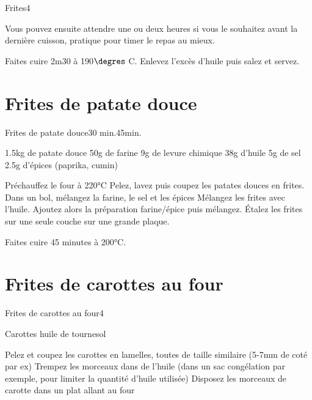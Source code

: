 {\begin{recette}{Frites}{4}{}{}
\begin{cuisson}
Vous pouvez ensuite attendre une ou deux heures si vous le souhaitez avant la dernière cuisson, pratique pour timer le repas au mieux. 

Faites cuire 2m30 à 190$\degres$ C. Enlevez l'excès d'huile puis salez et servez. 
\end{cuisson}
\end{recette}


\section{Frites de patate douce}
\begin{recette}{Frites de patate douce}{}{30 min.}{45min.}
\begin{ingredients}
\ingredient 1.5kg de patate douce
\ingredient 50g de farine
\ingredient 9g de levure chimique
\ingredient 38g d'huile
\ingredient 5g de sel
\ingredient 2.5g d'épices (paprika, cumin)
\end{ingredients}

\begin{preparation}
\etape Préchauffez le four à 220°C
\etape Pelez, lavez puis coupez les patates douces en frites.
\etape Dans un bol, mélangez la farine, le sel et les épices
\etape Mélangez les frites avec l'huile. Ajoutez alors la préparation farine/épice puis mélangez.
\etape Étalez les frites sur une seule couche sur une grande plaque.
\end{preparation}

\begin{cuisson}
Faites cuire 45 minutes à 200°C.
\end{cuisson}
\end{recette}

\section{Frites de carottes au four}
\begin{recette}{Frites de carottes au four}{4}{}{}
\begin{ingredients}
\ingredient Carottes
\ingredient huile de tournesol
\end{ingredients}

\begin{preparation}
\etape Pelez et coupez les carottes en lamelles, toutes de taille similaire (5-7mm de coté par ex)
\etape Trempez les morceaux dans de l'huile (dans un sac congélation par exemple, pour limiter la quantité d'huile utilisée)
\etape Disposez les morceaux de carotte dans un plat allant au four
\end{preparation}


\end{recette}}
